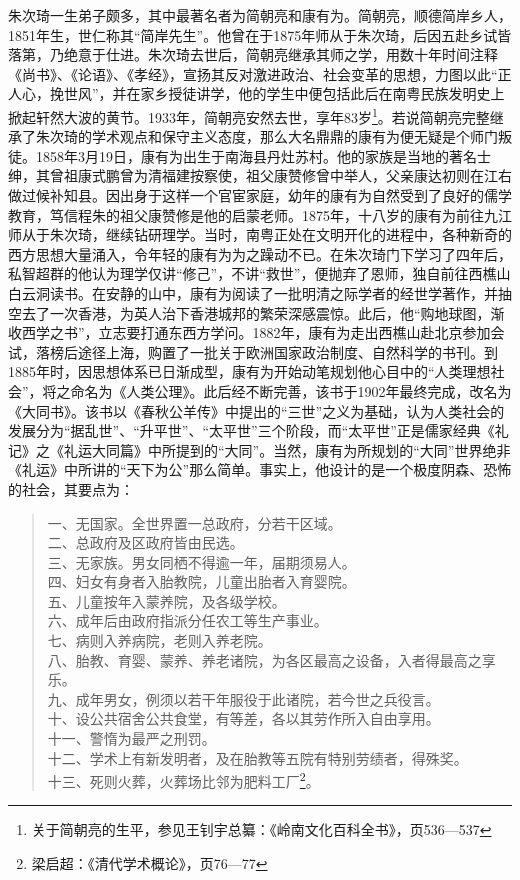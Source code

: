 朱次琦一生弟子颇多，其中最著名者为简朝亮和康有为。简朝亮，顺德简岸乡人，1851年生，世仁称其“简岸先生”。他曾在于1875年师从于朱次琦，后因五赴乡试皆落第，乃绝意于仕进。朱次琦去世后，简朝亮继承其师之学，用数十年时间注释《尚书》、《论语》、《孝经》，宣扬其反对激进政治、社会变革的思想，力图以此“正人心，挽世风”，并在家乡授徒讲学，他的学生中便包括此后在南粤民族发明史上掀起轩然大波的黄节。1933年，简朝亮安然去世，享年83岁\footnote{关于简朝亮的生平，参见王钊宇总纂：《岭南文化百科全书》，页536—537}。若说简朝亮完整继承了朱次琦的学术观点和保守主义态度，那么大名鼎鼎的康有为便无疑是个师门叛徒。1858年3月19日，康有为出生于南海县丹灶苏村。他的家族是当地的著名士绅，其曾祖康式鹏曾为清福建按察使，祖父康赞修曾中举人，父亲康达初则在江右做过候补知县。因出身于这样一个官宦家庭，幼年的康有为自然受到了良好的儒学教育，笃信程朱的祖父康赞修是他的启蒙老师。1875年，十八岁的康有为前往九江师从于朱次琦，继续钻研理学。当时，南粤正处在文明开化的进程中，各种新奇的西方思想大量涌入，令年轻的康有为为之躁动不已。在朱次琦门下学习了四年后，私智超群的他认为理学仅讲“修己”，不讲“救世”，便抛弃了恩师，独自前往西樵山白云洞读书。在安静的山中，康有为阅读了一批明清之际学者的经世学著作，并抽空去了一次香港，为英人治下香港城邦的繁荣深感震惊。此后，他“购地球图，渐收西学之书”，立志要打通东西方学问。1882年，康有为走出西樵山赴北京参加会试，落榜后途径上海，购置了一批关于欧洲国家政治制度、自然科学的书刊。到1885年时，因思想体系已日渐成型，康有为开始动笔规划他心目中的“人类理想社会”，将之命名为《人类公理》。此后经不断完善，该书于1902年最终完成，改名为《大同书》。该书以《春秋公羊传》中提出的“三世”之义为基础，认为人类社会的发展分为“据乱世”、“升平世”、“太平世”三个阶段，而“太平世”正是儒家经典《礼记》之《礼运大同篇》中所提到的“大同”。当然，康有为所规划的“大同”世界绝非《礼运》中所讲的“天下为公”那么简单。事实上，他设计的是一个极度阴森、恐怖的社会，其要点为：

\begin{quote}
	一、无国家。全世界置一总政府，分若干区域。\\
	二、总政府及区政府皆由民选。\\
	三、无家族。男女同栖不得逾一年，届期须易人。\\
	四、妇女有身者入胎教院，儿童出胎者入育婴院。\\
	五、儿童按年入蒙养院，及各级学校。\\
	六、成年后由政府指派分任农工等生产事业。\\
	七、病则入养病院，老则入养老院。\\
	八、胎教、育婴、蒙养、养老诸院，为各区最高之设备，入者得最高之享乐。\\
	九、成年男女，例须以若干年服役于此诸院，若今世之兵役言。\\
	十、设公共宿舍公共食堂，有等差，各以其劳作所入自由享用。\\
	十一、警惰为最严之刑罚。\\
	十二、学术上有新发明者，及在胎教等五院有特别劳绩者，得殊奖。\\
	十三、死则火葬，火葬场比邻为肥料工厂\footnote{梁启超：《清代学术概论》，页76—77}。
\end{quote}


